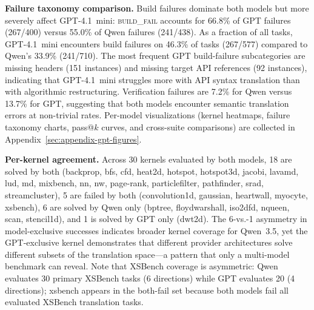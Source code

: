 \documentclass[conference]{IEEEtran}
\begin{document}
\textbf{Failure taxonomy comparison.}
Build failures dominate both models but more severely affect GPT-4.1~mini:
\textsc{build\_fail} accounts for 66.8\% of GPT failures (267/400) versus
55.0\% of Qwen failures (241/438). As a fraction of all tasks, GPT-4.1~mini
encounters build failures on 46.3\% of tasks (267/577) compared to Qwen's
33.9\% (241/710). The most frequent GPT build-failure subcategories are
missing headers (151 instances) and missing target API references (92
instances), indicating that GPT-4.1~mini struggles more with API syntax
translation than with algorithmic restructuring. Verification failures
are 7.2\% for Qwen versus 13.7\% for GPT, suggesting that
both models encounter semantic translation errors at non-trivial rates.
Per-model visualizations (kernel heatmaps, failure taxonomy charts,
pass@$k$ curves, and cross-suite comparisons) are collected in
Appendix~\ref{sec:appendix-gpt-figures}.

\textbf{Per-kernel agreement.}
Across 30 kernels evaluated by both models, 18 are solved by both
(backprop, bfs, cfd, heat2d, hotspot, hotspot3d, jacobi, lavamd, lud, md,
mixbench, nn, nw, page-rank, particlefilter, pathfinder, srad,
streamcluster), 5 are failed by both (convolution1d, gaussian, heartwall,
myocyte, xsbench), 6 are solved by Qwen only (bptree, floydwarshall,
iso2dfd, nqueen, scan, stencil1d), and 1 is solved by GPT only (dwt2d).
The 6-vs.-1 asymmetry in model-exclusive successes indicates broader
kernel coverage for Qwen~3.5, yet the GPT-exclusive kernel demonstrates
that different provider architectures solve different subsets of the
translation space---a pattern that only a multi-model benchmark can
reveal. Note that XSBench coverage is asymmetric: Qwen evaluates
30 primary XSBench tasks (6 directions) while GPT evaluates 20
(4 directions); xsbench appears in the both-fail set because
both models fail all evaluated XSBench translation tasks.
\end{document}
